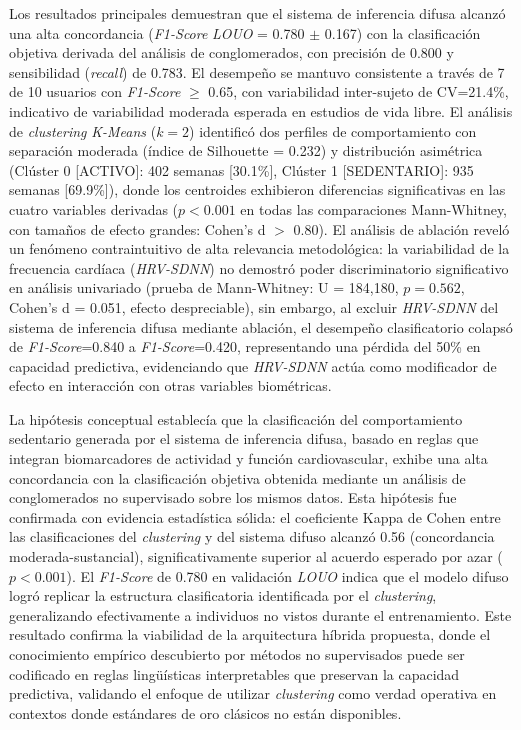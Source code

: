 Los resultados principales demuestran que el sistema de inferencia difusa alcanzó una alta concordancia (\textit{F1-Score} \textit{LOUO} = 0.780 $\pm$ 0.167) con la clasificación objetiva derivada del análisis de conglomerados, con precisión de 0.800 y sensibilidad (\textit{recall}) de 0.783. El desempeño se mantuvo consistente a través de 7 de 10 usuarios con \textit{F1-Score} $\geq$ 0.65, con variabilidad inter-sujeto de CV=21.4\%, indicativo de variabilidad moderada esperada en estudios de vida libre. El análisis de \textit{clustering} \textit{K-Means} ($k=2$) identificó dos perfiles de comportamiento con separación moderada (índice de Silhouette = 0.232) y distribución asimétrica (Clúster 0 [ACTIVO]: 402 semanas [30.1\%], Clúster 1 [SEDENTARIO]: 935 semanas [69.9\%]), donde los centroides exhibieron diferencias significativas en las cuatro variables derivadas ($p < 0.001$ en todas las comparaciones Mann-Whitney, con tamaños de efecto grandes: Cohen's d $>$ 0.80). El análisis de ablación reveló un fenómeno contraintuitivo de alta relevancia metodológica: la variabilidad de la frecuencia cardíaca (\textit{HRV-SDNN}) no demostró poder discriminatorio significativo en análisis univariado (prueba de Mann-Whitney: U = 184,180, $p=0.562$, Cohen's d = 0.051, efecto despreciable), sin embargo, al excluir \textit{HRV-SDNN} del sistema de inferencia difusa mediante ablación, el desempeño clasificatorio colapsó de \textit{F1-Score}=0.840 a \textit{F1-Score}=0.420, representando una pérdida del 50\% en capacidad predictiva, evidenciando que \textit{HRV-SDNN} actúa como modificador de efecto en interacción con otras variables biométricas.


La hipótesis conceptual establecía que la clasificación del comportamiento sedentario generada por el sistema de inferencia difusa, basado en reglas que integran biomarcadores de actividad y función cardiovascular, exhibe una alta concordancia con la clasificación objetiva obtenida mediante un análisis de conglomerados no supervisado sobre los mismos datos. Esta hipótesis fue confirmada con evidencia estadística sólida: el coeficiente Kappa de Cohen entre las clasificaciones del \textit{clustering} y del sistema difuso alcanzó 0.56 (concordancia moderada-sustancial), significativamente superior al acuerdo esperado por azar ($p < 0.001$). El \textit{F1-Score} de 0.780 en validación \textit{LOUO} indica que el modelo difuso logró replicar la estructura clasificatoria identificada por el \textit{clustering}, generalizando efectivamente a individuos no vistos durante el entrenamiento. Este resultado confirma la viabilidad de la arquitectura híbrida propuesta, donde el conocimiento empírico descubierto por métodos no supervisados puede ser codificado en reglas lingüísticas interpretables que preservan la capacidad predictiva, validando el enfoque de utilizar \textit{clustering} como verdad operativa en contextos donde estándares de oro clásicos no están disponibles.

